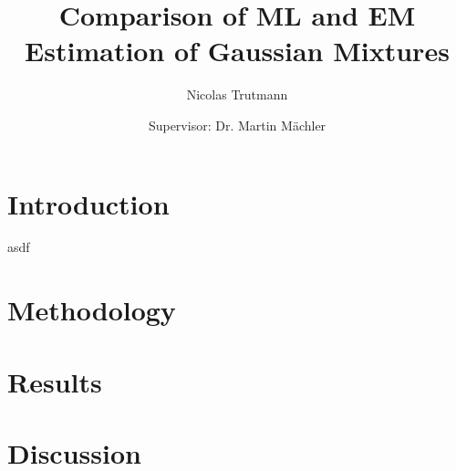 


\title{Comparison of ML and EM Estimation of Gaussian Mixtures}
\author{Nicolas Trutmann \and Supervisor: Dr. Martin Mächler}




\maketitle

\tableofcontents

\chapter{Introduction}

asdf \cite{McLGP00}

\chapter{Methodology}

\chapter{Results}

\chapter{Discussion}






